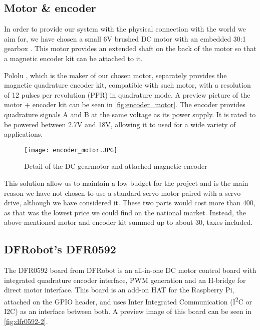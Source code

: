 \subsection{Motor \& encoder}
In order to provide our system with the physical connection with the world we aim for, we have chosen a small 6V brushed DC motor with an embedded 30:1 gearbox \cite{product:pololu-micrometal-gearmotor}.
This motor provides an extended shaft on the back of the motor so that a magnetic encoder kit can be attached to it.

Pololu \cite{brand:pololu}, which is the maker of our chosen motor, separately provides the magnetic quadrature encoder kit, compatible with such motor, with a resolution of 12 pulses per revolution (PPR) in quadrature mode.
A preview picture of the motor + encoder kit can be seen in \autoref{fig:encoder_motor}.
The encoder provides quadrature signals A and B at the same voltage as its power supply.
It is rated to be powered between 2.7V and 18V, allowing it to used for a wide variety of applications.

\begin{figure}[htp]
	\centering
	\texttt{[image: encoder\_motor.JPG]}
	\caption{Detail of the DC gearmotor and attached magnetic encoder}
	\label{fig:encoder_motor}
\end{figure}

This solution allow us to maintain a low budget for the project and is the main reason we have not chosen to use a standard servo motor paired with a servo drive, although we have considered it.
These two parts would cost more than 400\texteuro, as that was the lowest price we could find on the national market.
Instead, the above mentioned motor and encoder kit summed up to about 30\texteuro, taxes included.

\subsection{DFRobot's DFR0592}
The DFR0592 board from DFRobot is an all-in-one DC motor control board with integrated quadrature encoder interface, PWM generation and an H-bridge for direct motor interface.
This board is an add-on HAT for the Raspberry Pi, attached on the GPIO header, and uses Inter Integrated Communication (I\textsuperscript{2}C or I2C) as an interface between both.
A preview image of this board can be seen in \autoref{fig:dfr0592-2}.

